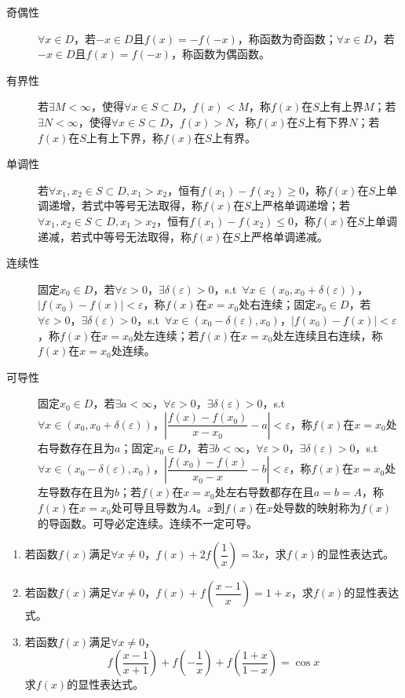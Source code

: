 \begin{description}
	\item[奇偶性] $\forall x\in D$，若$-x\in D$且$f(x)=-f(-x)$，称函数为奇函数；$\forall x\in D$，若$-x\in D$且$f(x)=f(-x)$，称函数为偶函数。
	\item[有界性] 若$\exists M<\infty$，使得$\forall x\in S\subset D$，$f(x)<M$，称$f(x)$在$S$上有上界$M$；若$\exists N<\infty$，使得$\forall x\in S\subset D$，$f(x)>N$，称$f(x)$在$S$上有下界$N$；若$f(x)$在$S$上有上下界，称$f(x)$在$S$上有界。
	\item[单调性] 若$\forall x_1,x_2\in S\subset D,x_1>x_2$，恒有$f(x_1)-f(x_2)\geqslant 0$，称$f(x)$在$S$上单调递增，若式中等号无法取得，称$f(x)$在$S$上严格单调递增；若$\forall x_1,x_2\in S\subset D,x_1>x_2$，恒有$f(x_1)-f(x_2)\leqslant 0$，称$f(x)$在$S$上单调递减，若式中等号无法取得，称$f(x)$在$S$上严格单调递减。
	\item[连续性] 固定$x_0\in D$，若$\forall\varepsilon>0$，$\exists \delta(\varepsilon)>0$，s.t\ $\forall x\in(x_0,x_0+\delta(\varepsilon))$，$|f(x_0)-f(x)|<\varepsilon$，称$f(x)$在$x=x_0$处右连续；固定$x_0\in D$，若$\forall\varepsilon>0$，$\exists \delta(\varepsilon)>0$，s.t\ $\forall x\in(x_0-\delta(\varepsilon),x_0)$，$|f(x_0)-f(x)|<\varepsilon$，称$f(x)$在$x=x_0$处左连续；若$f(x)$在$x=x_0$处左连续且右连续，称$f(x)$在$x=x_0$处连续。
	\item[可导性] 固定$x_0\in D$，若$\exists a<\infty$，$\forall\varepsilon>0$，$\exists \delta(\varepsilon)>0$，s.t\ $\forall x\in(x_0,x_0+\delta(\varepsilon))$，$\left|\dfrac{f(x)-f(x_0)}{x-x_0}-a\right|<\varepsilon$，称$f(x)$在$x=x_0$处右导数存在且为$a$；固定$x_0\in D$，若$\exists b<\infty$，$\forall\varepsilon>0$，$\exists \delta(\varepsilon)>0$，s.t\ $\forall x\in(x_0-\delta(\varepsilon),x_0)$，$\left|\dfrac{f(x_0)-f(x)}{x_0-x}-b\right|<\varepsilon$，称$f(x)$在$x=x_0$处左导数存在且为$b$；若$f(x)$在$x=x_0$处左右导数都存在且$a=b=A$，称$f(x)$在$x=x_0$处可导且导数为$A$。$x$到$f(x)$在$x$处导数的映射称为$f(x)$的导函数。可导必定连续。连续不一定可导。
\end{description}
\begin{que}
	\begin{enumerate}
		\item 若函数$f(x)$满足$\forall x\neq 0$，$f(x)+2f\left(\dfrac{1}{x}\right)=3x$，求$f(x)$的显性表达式。
		\item 若函数$f(x)$满足$\forall x\neq 0$，$f(x)+f\left(\dfrac{x-1}{x}\right)=1+x$，求$f(x)$的显性表达式。
		\item 若函数$f(x)$满足$\forall x\neq 0$，$$f\left(\dfrac{x-1}{x+1}\right)+f\left(-\dfrac{1}{x}\right)+f\left(\dfrac{1+x}{1-x}\right)=\cos x$$求$f(x)$的显性表达式。
	\end{enumerate}
\end{que}
